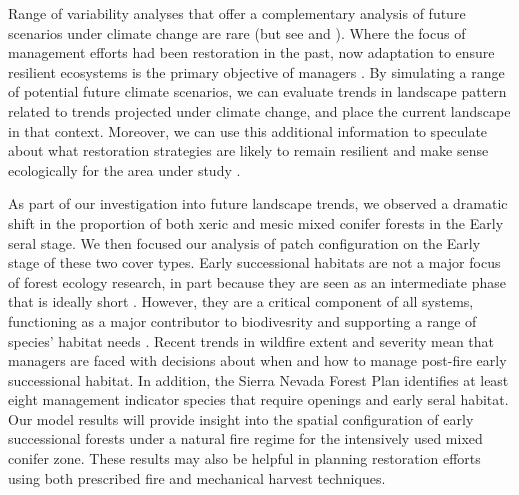 Range of variability analyses that offer a complementary analysis of future scenarios under climate change are rare (but see \cite{Keane2008} and \cite{Duveneck2014}). Where the focus of management efforts had been restoration in the past, now adaptation to ensure resilient ecosystems is the primary objective of managers \citep{Stephens2010}. By simulating a range of potential future climate scenarios, we can evaluate trends in landscape pattern related to trends projected under climate change, and place the current landscape in that context. Moreover, we can use this additional information to speculate about what restoration strategies are likely to remain resilient and make sense ecologically for the area under study \citep{Duncan2010}. 

As part of our investigation into future landscape trends, we observed a dramatic shift in the proportion of both xeric and mesic mixed conifer forests in the Early seral stage. We then focused our analysis of patch configuration on the Early stage of these two cover types. Early successional habitats are not a major focus of forest ecology research, in part because they are seen as an intermediate phase that is ideally short \citep{Swanson2011}. However, they are a critical component of all systems, functioning as a major contributor to biodivesrity and supporting a range of species' habitat needs \citep{Chang1995,Hutto2008,Swanson2011}. Recent trends in wildfire extent and severity mean that managers are faced with decisions about when and how to manage post-fire early successional habitat. In addition, the Sierra Nevada Forest Plan identifies at least eight management indicator species that require openings and early seral habitat. Our model results will provide insight into the spatial configuration of early successional forests under a natural fire regime for the intensively used mixed conifer zone. These results may also be helpful in planning restoration efforts using both prescribed fire and mechanical harvest techniques.





